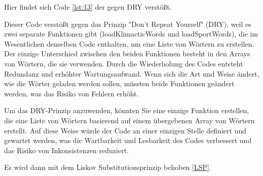 Hier findet sich Code \ref{lst:13} der gegen DRY verstößt.

Dieser Code verstößt gegen das Prinzip "Don't Repeat Yourself" (DRY), weil es zwei separate Funktionen gibt (loadKlimacticWords und loadSportWords), die im Wesentlichen denselben Code enthalten, um eine Liste von Wörtern zu erstellen. Der einzige Unterschied zwischen den beiden Funktionen besteht in den Arrays von Wörtern, die sie verwenden. Durch die Wiederholung des Codes entsteht Redundanz und erhöhter Wartungsaufwand. Wenn sich die Art und Weise ändert, wie die Wörter geladen werden sollen, müssten beide Funktionen geändert werden, was das Risiko von Fehlern erhöht.

Um das DRY-Prinzip anzuwenden, könnten Sie eine einzige Funktion erstellen, die eine Liste von Wörtern basierend auf einem übergebenen Array von Wörtern erstellt. Auf diese Weise würde der Code an einer einzigen Stelle definiert und gewartet werden, was die Wartbarkeit und Lesbarkeit des Codes verbessert und das Risiko von Inkonsistenzen reduziert.

Es wird dann mit dem Liskov Substitutionsprinzip behoben \ref{LSP}.